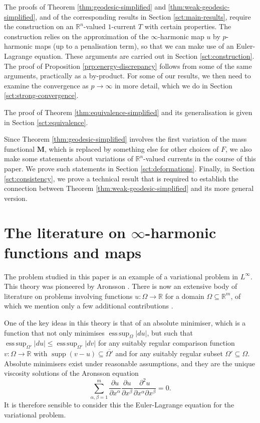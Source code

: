 \documentclass[a4paper]{article}
\newcommand{\R}{\mathbb{R}}
\newcommand{\M}{\mathbf{M}}
\DeclareMathOperator*{\esssup}{ess \, sup}
\DeclareMathOperator{\supp}{supp}
\newcommand{\dd}[2]{\frac{\partial #1}{\partial #2}}
\theoremstyle{definition}
\theoremstyle{remark}
\begin{document}
The proofs of Theorem \ref{thm:geodesic-simplified} and \ref{thm:weak-geodesic-simplified},
and of the corresponding results in Section \ref{sct:main-results},
require the construction on an $\R^n$-valued $1$-current $T$ with certain
properties. The construction relies on the approximation of the
$\infty$-harmonic map $u$ by $p$-harmonic maps (up to a penalisation term),
so that we can make use of an Euler-Lagrange equation. These arguments are
carried out in Section \ref{sct:construction}. The proof of Proposition \ref{prp:energy-discrepancy}
follows from some of the same arguments, practically as a by-product. For some of our results, we
then need to examine the convergence as $p \to \infty$ in more detail,
which we do in Section \ref{sct:strong-convergence}.

The proof of Theorem \ref{thm:equivalence-simplified} and its generalisation
is given in Section \ref{sct:equivalence}.

Since Theorem \ref{thm:geodesic-simplified} involves the first variation
of the mass functional $\M$, which is replaced by something else for other
choices of $F$, we also make some statements about variations of
$\R^n$-valued currents in the course of this paper. We prove such statements
in Section \ref{sct:deformations}. Finally, in Section \ref{sct:consistency},
we prove a technical result that is required to establish the connection
between Theorem \ref{thm:weak-geodesic-simplified} and its more general
version.







\section{The literature on $\infty$-harmonic functions and maps}

The problem studied in this paper is an example of a variational problem in
$L^\infty$. This theory was pioneered by Aronsson \cite{Aronsson:65, Aronsson:66, Aronsson:67, Aronsson:68, Aronsson:84}. There is now an extensive body of
literature on problems involving functions $u \colon \Omega \to \R$
for a domain $\Omega \subseteq \R^m$, of which we mention only a few additional
contributions \cite{Bhattacharya-DiBenedetto-Manfredi:89, Jensen:93, Savin:05, Evans-Savin:08, Evans-Smart:11.2}.

One of the key ideas in this theory is that of an absolute minimiser, which
is a function that not only minimises $\esssup_{\Omega} |du|$, but such that
$\esssup_{\Omega'} |du| \le \esssup_{\Omega'} |dv|$ for any suitably regular comparison
function $v \colon \Omega \to \R$ with $\supp(v - u) \subseteq \overline{\Omega'}$ and
for any suitably regular subset $\Omega' \subseteq \Omega$.
Absolute minimisers exist under reasonable assumptions, and they are the unique
viscosity solutions of the Aronsson equation
\[
\sum_{\alpha, \beta = 1}^m \dd{u}{x^\alpha} \dd{u}{x^\beta} \frac{\partial^2 u}{\partial x^\alpha \partial x^\beta} = 0.
\]
It is therefore sensible to consider this the Euler-Lagrange equation for the
variational problem.
\end{document}
